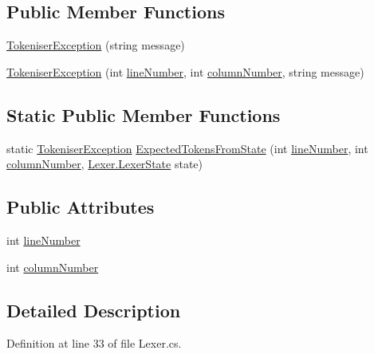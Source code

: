 \subsection*{Public Member Functions}
\begin{DoxyCompactItemize}
\item 
\hyperlink{a00164_ad00fcf742d2b0d476ce43b27a3f3b6c1}{Tokeniser\-Exception} (string message)
\item 
\hyperlink{a00164_aa8674d006a0d29081a7b87bdd8ff2f4f}{Tokeniser\-Exception} (int \hyperlink{a00164_a54b936d7b4f26f88a07a66c5fc1d1ad1}{line\-Number}, int \hyperlink{a00164_aabf2ad38f3984297c1daede9be55e3d6}{column\-Number}, string message)
\end{DoxyCompactItemize}
\subsection*{Static Public Member Functions}
\begin{DoxyCompactItemize}
\item 
static \hyperlink{a00164}{Tokeniser\-Exception} \hyperlink{a00164_af88cfa5eafdee355e1abb67e358497bd}{Expected\-Tokens\-From\-State} (int \hyperlink{a00164_a54b936d7b4f26f88a07a66c5fc1d1ad1}{line\-Number}, int \hyperlink{a00164_aabf2ad38f3984297c1daede9be55e3d6}{column\-Number}, \hyperlink{a00118}{Lexer.\-Lexer\-State} state)
\end{DoxyCompactItemize}
\subsection*{Public Attributes}
\begin{DoxyCompactItemize}
\item 
int \hyperlink{a00164_a54b936d7b4f26f88a07a66c5fc1d1ad1}{line\-Number}
\item 
int \hyperlink{a00164_aabf2ad38f3984297c1daede9be55e3d6}{column\-Number}
\end{DoxyCompactItemize}


\subsection{Detailed Description}


Definition at line 33 of file Lexer.\-cs.



